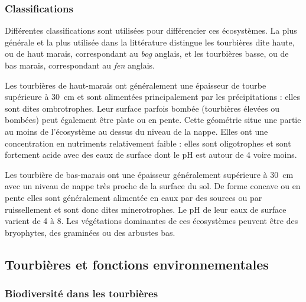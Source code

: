 \subsubsection{Classifications}

Différentes classifications sont utilisées pour différencier ces écosystèmes.
La plus générale et la plus utilisée dans la littérature distingue les tourbières dite haute, ou de haut marais, correspondant au \textit{bog} anglais, et les tourbières basse, ou de bas marais, correspondant au \textit{fen} anglais.

Les tourbières de haut-marais ont généralement une épaisseur de tourbe supérieure à \SI{30}{\cm} et sont alimentées principalement par les précipitations : elles sont dites ombrotrophes.
Leur surface parfois bombée (tourbières élevées ou bombées) peut également être plate ou en pente.
Cette géométrie situe une partie au moins de l'écosystème au dessus du niveau de la nappe.
Elles ont une concentration en nutriments relativement faible : elles sont oligotrophes et sont fortement acide avec des eaux de surface dont le pH est autour de 4 voire moins.

Les tourbière de bas-marais ont une épaisseur généralement supérieure à \SI{30}{\cm} avec un niveau de nappe très proche de la surface du sol.
De forme concave ou en pente elles sont généralement alimentée en eaux par des sources ou par ruissellement et sont donc dites minerotrophes.
Le pH de leur eaux de surface varient de 4 à 8.
Les végétations dominantes de ces écosystèmes peuvent être des bryophytes, des graminées ou des arbustes bas.


\subsection{Tourbières et fonctions environnementales}



\subsubsection{Biodiversité dans les tourbières}

